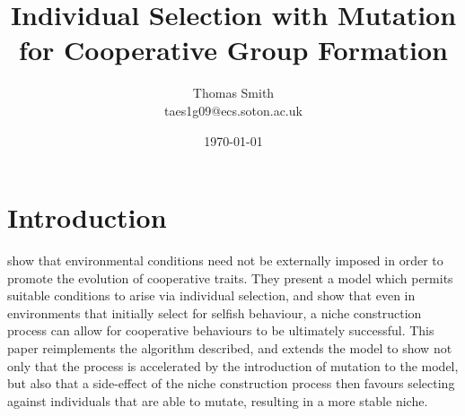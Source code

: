 \documentclass[11pt]{article}
\begin{document}
\title      {\vspace{-2cm}\textbf{Individual Selection with Mutation for Cooperative Group Formation}}
\author	    {Thomas Smith\\taes1g09@ecs.soton.ac.uk}
\date       {\today}
\maketitle
\section{Introduction}

\citet*{orig} show that environmental conditions need not be externally imposed in order to promote the evolution of cooperative traits. They present a model which permits suitable conditions to arise via individual selection, and show that even in environments that initially select for selfish behaviour, a niche construction process can allow for cooperative behaviours to be ultimately successful. This paper reimplements the algorithm described, and extends the model to show not only that the process is accelerated by the introduction of mutation to the model, but also that a side-effect of the niche construction process then favours selecting against individuals that are able to mutate, resulting in a more stable niche.
\end{document}
